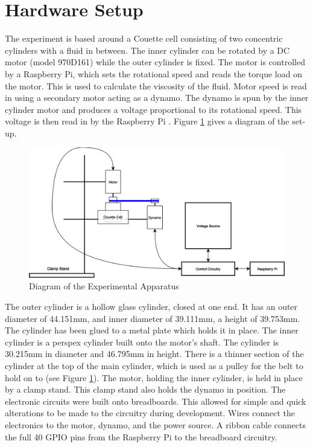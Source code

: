\documentclass[twoside,a4]{report}
\def\br{\newline \newline \noindent}
\def\rpi{Raspberry Pi }
\begin{document}
	\section{Hardware Setup} %
	The experiment is based around a Couette cell consisting of two concentric cylinders with a fluid in between. The inner cylinder can be rotated by a DC motor (model 970D161) while the outer cylinder is fixed. The motor is controlled by a Raspberry Pi, which sets the rotational speed and reads the torque load on the motor. This is used to calculate the viscosity of the fluid. Motor speed is read in using a secondary motor acting as a dynamo. The dynamo is spun by the inner cylinder motor and produces a voltage proportional to its rotational speed. This voltage is then read in by the \rpi.
	Figure \ref{expdia} gives a diagram of the set-up.\newline
	\begin{figure}[!htb]
		\centering
		\includegraphics[scale=0.3]{images/exp_set_up.png} %
		\caption{Diagram of the Experimental Apparatus}
		\label{expdia}
	\end{figure} \newline \noindent
	The outer cylinder is a hollow glass cylinder, closed at one end. It has an outer diameter of 44.151mm, and inner diameter of 39.111mm, a height of 39.753mm. The cylinder has been glued to a metal plate which holds it in place. \br
	The inner cylinder is a perspex cylinder built onto the motor's shaft. The cylinder is 30.215mm in diameter and 46.795mm in height. There is a thinner section of the cylinder at the top of the main cylinder, which is used as a pulley for the belt to hold on to (see Figure \ref{expdia}). \br
	The motor, holding the inner cylinder, is held in place by a clamp stand. This clamp stand also holds the dynamo in position.\br
	The electronic circuits were built onto breadboards. This allowed for simple and quick alterations to be made to the circuitry during development. Wires connect the electronics to the motor, dynamo, and the power source. A ribbon cable connects the full 40 GPIO pins from the Raspberry Pi to the breadboard circuitry.
	
\end{document}
